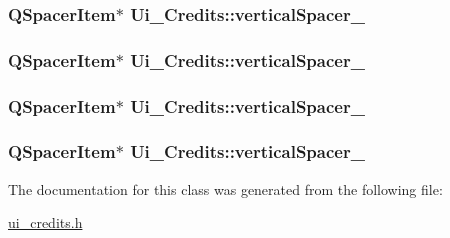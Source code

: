 \hypertarget{classUi__Credits_af68ec8e0f4b7c88ac4b79c0043c4fe14}{
\subsubsection[{vertical\-Spacer\-\_\-3}]{\setlength{\rightskip}{0pt plus 5cm}Q\-Spacer\-Item$\ast$ Ui\-\_\-\-Credits\-::vertical\-Spacer\-\_}}\label{classUi__Credits_af68ec8e0f4b7c88ac4b79c0043c4fe14}
\hypertarget{classUi__Credits_abaa2364899bd149b6bb07369fcc3664e}{
\subsubsection[{vertical\-Spacer\-\_\-4}]{\setlength{\rightskip}{0pt plus 5cm}Q\-Spacer\-Item$\ast$ Ui\-\_\-\-Credits\-::vertical\-Spacer\-\_}}\label{classUi__Credits_abaa2364899bd149b6bb07369fcc3664e}
\hypertarget{classUi__Credits_a8c7673110ee4215319bf1d23f087d27b}{
\subsubsection[{vertical\-Spacer\-\_\-5}]{\setlength{\rightskip}{0pt plus 5cm}Q\-Spacer\-Item$\ast$ Ui\-\_\-\-Credits\-::vertical\-Spacer\-\_}}\label{classUi__Credits_a8c7673110ee4215319bf1d23f087d27b}
\hypertarget{classUi__Credits_a2b352beb7121e2ae1dd77ac9edea2440}{
\subsubsection[{vertical\-Spacer\-\_\-6}]{\setlength{\rightskip}{0pt plus 5cm}Q\-Spacer\-Item$\ast$ Ui\-\_\-\-Credits\-::vertical\-Spacer\-\_}}\label{classUi__Credits_a2b352beb7121e2ae1dd77ac9edea2440}


The documentation for this class was generated from the following file\-:\begin{DoxyCompactItemize}
\item 
\hyperlink{ui__credits_8h}{ui\-\_\-credits.\-h}\end{DoxyCompactItemize}
